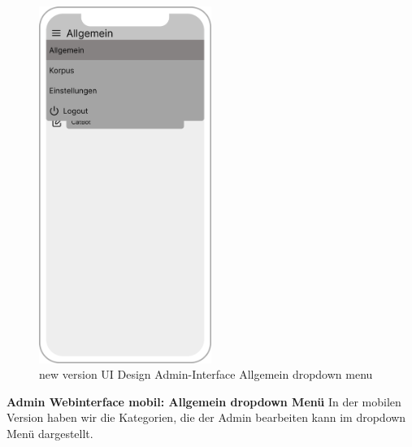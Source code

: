 \begin{figure}[H]
    \centering
    \includegraphics[width=0.5\textwidth]{bilder/new vers. UI Design/Allgemein/iPhone X Allgemein dropdown.png}
    \caption{new version UI Design Admin-Interface Allgemein dropdown menu}
    \label{fig:new version UI Design Admin-Interface Allgemein dropdown menu}
\end{figure}
\noindent \textbf{Admin Webinterface mobil: Allgemein dropdown Menü} \newline
In der mobilen Version haben wir die Kategorien, die der Admin bearbeiten kann im dropdown Menü dargestellt.


